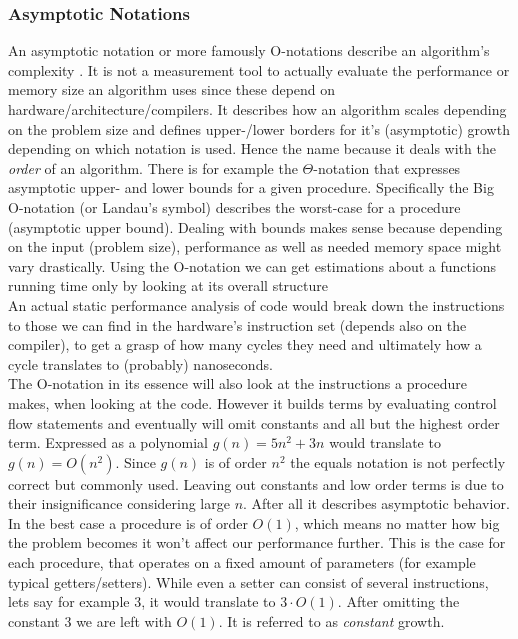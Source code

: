 \subsubsection{Asymptotic Notations}
An asymptotic notation or more famously O-notations describe an algorithm's complexity . It is not a measurement tool to actually evaluate the performance or memory size an algorithm uses since these depend on hardware/architecture/compilers. It describes how an algorithm scales depending on the problem size and defines upper-/lower borders for it's (asymptotic) growth depending on which notation is used. Hence the name because it deals with the \textit{order} of an algorithm.
There is for example the $\Theta$-notation that expresses asymptotic upper- and lower bounds for a given procedure.
Specifically the Big O-notation (or Landau's symbol) describes the worst-case for a procedure (asymptotic upper bound). Dealing with bounds makes sense because depending on the input (problem size), performance as well as needed memory space might vary drastically. Using the O-notation we can get estimations about a functions running time only by looking at its overall structure \\
An actual static performance analysis of code would break down the instructions to those we can find in the hardware's instruction set (depends also on the compiler), to get a grasp of how many cycles they need and ultimately how a cycle translates to (probably) nanoseconds.\\
The O-notation in its essence will also look at the instructions a procedure makes, when looking at the code. However it builds terms by evaluating control flow statements and eventually will omit constants and all but the highest order term. Expressed as a polynomial $g(n) = 5n^2+3n$ would translate to $g(n) = O(n^2)$. Since $g(n)$ is of order $n^2$ the equals notation is not perfectly correct but commonly used. Leaving out constants and low order terms is due to their insignificance considering large $n$. After all it describes asymptotic behavior.\\
In the best case a procedure is of order $O(1)$, which means no matter how big the problem becomes it won't affect our performance further. This is the case for each procedure, that operates on a fixed amount of parameters (for example typical getters/setters). While even a setter can consist of several instructions, lets say for example 3, it would translate to $3\cdot O(1)$. After omitting the constant $3$ we are left with $O(1)$. It is referred to as \textit{constant} growth.\\
